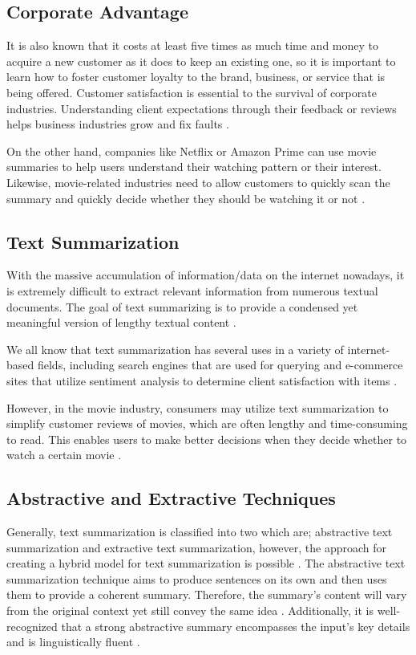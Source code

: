 \documentclass[conference]{IEEEtran}
\begin{document}
\subsection{Corporate Advantage}
It is also known that it costs at least five times as much time and money to acquire a new customer as it does to keep an existing one, so it is important to learn how to foster customer loyalty to the brand, business, or service that is being offered. Customer satisfaction is essential to the survival of corporate industries. Understanding client expectations through their feedback or reviews helps business industries grow and fix faults \cite{pizam_ellis_1999}.

On the other hand, companies like Netflix or Amazon Prime can use movie summaries to help users understand their watching pattern or their interest. Likewise, movie-related industries need to allow customers to quickly scan the summary and quickly decide whether they should be watching it or not \cite{khan_gul_zareei_biswal_zeb_naeem_saeed_salim_2020}.

\subsection{Text Summarization}
With the massive accumulation of information/data on the internet nowadays, it is extremely difficult to extract relevant information from numerous textual documents. The goal of text summarizing is to provide a condensed yet meaningful version of lengthy textual content \cite{shi_keneshloo_ramakrishnan_reddy_2020}. 

We all know that text summarization has several uses in a variety of internet-based fields, including search engines that are used for querying and e-commerce sites that utilize sentiment analysis to determine client satisfaction with items \cite{etemad_abidi_chhabra_2021}.

However, in the movie industry, consumers may utilize text summarization to simplify customer reviews of movies, which are often lengthy and time-consuming to read. This enables users to make better decisions when they decide whether to watch a certain movie \cite{khan_gul_zareei_biswal_zeb_naeem_saeed_salim_2020}.

\subsection{Abstractive and Extractive Techniques}
Generally, text summarization is classified into two which are; abstractive text summarization and extractive text summarization, however, the approach for creating a hybrid model for text summarization is possible \cite{alsaqer_sasi_2017}. The abstractive text summarization technique aims to produce sentences on its own and then uses them to provide a coherent summary. Therefore, the summary's content will vary from the original context yet still convey the same idea \cite{etemad_abidi_chhabra_2021}. Additionally, it is well-recognized that a strong abstractive summary encompasses the input's key details and is linguistically fluent \cite{zhang_xu_wang_2019}.
\end{document}
